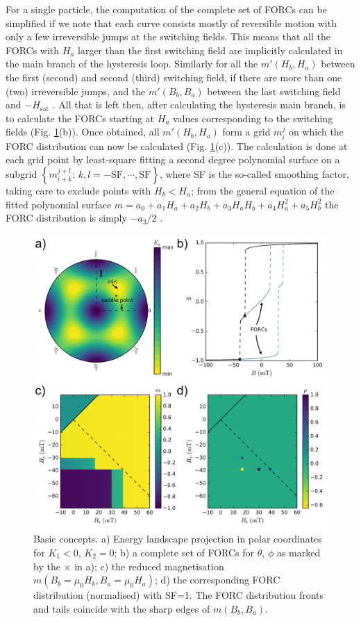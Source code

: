 For a single particle, the computation of the complete set of FORCs can be simplified if we note that each curve consists mostly of reversible motion with only a few irreversible jumps at the switching fields. This means that all the FORCs with $H_a$ larger than the first switching field are implicitly calculated in the main branch of the hysteresis loop. Similarly for all the $m'(H_b, H_a)$ between the first (second) and second (third) switching field, if there are more than one (two) irreversible jumps, and the $m'(B_b, B_a)$ between the last switching field and $-H_{\text{sat}}$ . All that is left then, after calculating the hysteresis main branch, is to calculate the FORCs starting at $H_a$ values corresponding to the switching fields (Fig. \ref{FIG_E01}(b)). Once obtained, all $m'(H_b, H_a)$ form a grid $m_i^j$ on which the FORC distribution can now be calculated (Fig. \ref{FIG_E01}(c)). The calculation is done at each grid point by least-square fitting a second degree polynomial surface on a subgrid $\left\{ m_{i+k}^{j+l}:\, k, l=-\text{SF},\cdots,\text{SF} \right\}$, where SF is the so-called smoothing factor, taking care to exclude points with $H_b<H_a$; from the general equation of the fitted polynomial surface $m = a_0 + a_1 H_a + a_2 H_b + a_3 H_a H_b + a_4 H_a^2 + a_5 H_b^2$ the FORC distribution is simply $-a_3/2$ \citep{Pike1999}.
\begin{figure}
\includegraphics[width=\textwidth]{research-2/figs/FIG01.pdf}
\caption[Basic FORC modelling concepts]{Basic concepts. a) Energy landscape projection in polar coordinates for $K_1<0,\, K_2=0$; b) a complete set of FORCs for $\theta ,\,\phi$ as marked by the $\boldsymbol{\times}$ in a); c) the reduced magnetisation $m(B_b=\mu_0 H_b, B_a=\mu_0 H_a)$; d) the corresponding FORC distribution (normalised) with SF=1. The FORC distribution fronts and tails coincide with the sharp edges of $m(B_b, B_a)$.}
\label{FIG_E01}
\end{figure}
